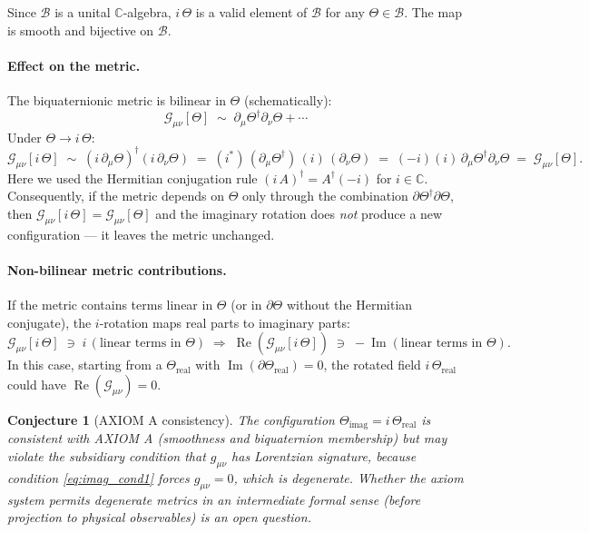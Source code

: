\documentclass[12pt]{article}
\newtheorem{conjecture}{Conjecture}
\begin{document}
Since $\mathcal{B}$ is a unital $\mathbb{C}$-algebra, $i\,\Theta$
is a valid element of $\mathcal{B}$ for any $\Theta \in \mathcal{B}$.
The map is smooth and bijective on $\mathcal{B}$.

\paragraph{Effect on the metric.}
The biquaternionic metric is bilinear in $\Theta$ (schematically):
\begin{equation}
  \mathcal{G}_{\mu\nu}[\Theta]
  \;\sim\; \partial_\mu\Theta^\dagger \partial_\nu\Theta + \cdots
\end{equation}
Under $\Theta \to i\,\Theta$:
\begin{equation}
  \mathcal{G}_{\mu\nu}[i\,\Theta]
  \;\sim\; (i\,\partial_\mu\Theta)^\dagger (i\,\partial_\nu\Theta)
  \;=\; (i^*)\,(\partial_\mu\Theta^\dagger)\,(i)\,(\partial_\nu\Theta)
  \;=\; (-i)(i)\,\partial_\mu\Theta^\dagger \partial_\nu\Theta
  \;=\; \mathcal{G}_{\mu\nu}[\Theta].
\end{equation}
Here we used the Hermitian conjugation rule $(i\,A)^\dagger = A^\dagger(-i)$
for $i \in \mathbb{C}$.  Consequently, if the metric depends on $\Theta$
only through the combination $\partial\Theta^\dagger \partial\Theta$, then
$\mathcal{G}_{\mu\nu}[i\,\Theta] = \mathcal{G}_{\mu\nu}[\Theta]$ and the
imaginary rotation does \emph{not} produce a new configuration — it leaves
the metric unchanged.

\paragraph{Non-bilinear metric contributions.}
If the metric contains terms linear in $\Theta$ (or in $\partial\Theta$
without the Hermitian conjugate), the $i$-rotation maps real parts to
imaginary parts:
\begin{equation}
  \mathcal{G}_{\mu\nu}[i\,\Theta]
  \;\ni\; i\,(\text{linear terms in }\Theta)
  \;\Rightarrow\;
  \operatorname{Re}(\mathcal{G}_{\mu\nu}[i\,\Theta])
  \;\ni\; -\operatorname{Im}(\text{linear terms in }\Theta).
\end{equation}
In this case, starting from a $\Theta_\mathrm{real}$ with
$\operatorname{Im}(\partial\Theta_\mathrm{real}) = 0$, the rotated
field $i\,\Theta_\mathrm{real}$ could have
$\operatorname{Re}(\mathcal{G}_{\mu\nu}) = 0$.

\begin{conjecture}[AXIOM A consistency]
\label{conj:axiom_a}
The configuration $\Theta_\mathrm{imag} = i\,\Theta_\mathrm{real}$ is
consistent with AXIOM A (smoothness and biquaternion membership) but
may violate the subsidiary condition that $g_{\mu\nu}$ has Lorentzian
signature, because condition \eqref{eq:imag_cond1} forces $g_{\mu\nu} = 0$,
which is degenerate.  Whether the axiom system permits degenerate metrics
in an intermediate formal sense (before projection to physical observables)
is an open question.
\end{conjecture}
\end{document}
